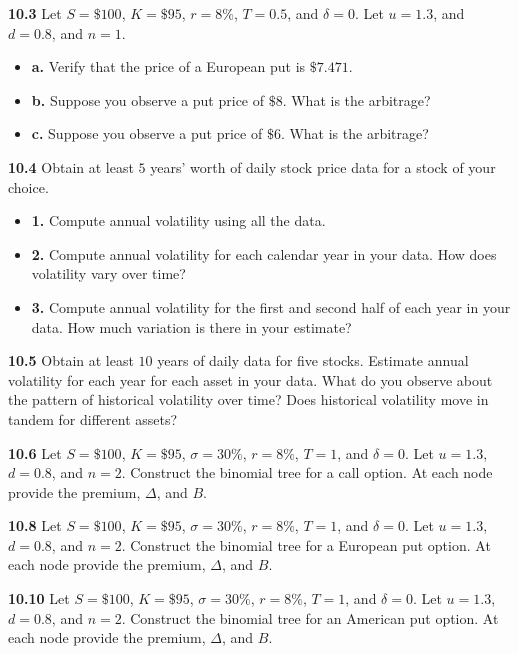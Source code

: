 \documentclass[
  letterpaper,
  DIV=11,
  numbers=noendperiod]{scrartcl}
\begin{document}
\textbf{10.3} Let \(S = \$100\), \(K = \$95\), \(r = 8\%\), \(T = 0.5\),
and \(\delta = 0\). Let \(u = 1.3\), and \(d = 0.8\), and \(n = 1\).

\begin{itemize}
\item
  \textbf{a.} Verify that the price of a European put is \(\$7.471\).
\item
  \textbf{b.} Suppose you observe a put price of \(\$8\). What is the
  arbitrage?
\item
  \textbf{c.} Suppose you observe a put price of \(\$6\). What is the
  arbitrage?
\end{itemize}

\textbf{10.4} Obtain at least \(5\) years' worth of daily stock price
data for a stock of your choice.

\begin{itemize}
\item
  \textbf{1.} Compute annual volatility using all the data.
\item
  \textbf{2.} Compute annual volatility for each calendar year in your
  data. How does volatility vary over time?
\item
  \textbf{3.} Compute annual volatility for the first and second half of
  each year in your data. How much variation is there in your estimate?
\end{itemize}

\textbf{10.5} Obtain at least \(10\) years of daily data for five
stocks. Estimate annual volatility for each year for each asset in your
data. What do you observe about the pattern of historical volatility
over time? Does historical volatility move in tandem for different
assets?

\textbf{10.6} Let \(S = \$100\), \(K = \$95\), \(\sigma = 30\%\),
\(r = 8\%\), \(T = 1\), and \(\delta = 0\). Let \(u = 1.3\),
\(d = 0.8\), and \(n = 2\). Construct the binomial tree for a call
option. At each node provide the premium, \(\Delta\), and \(B\).

\textbf{10.8} Let \(S = \$100\), \(K = \$95\), \(\sigma = 30\%\),
\(r = 8\%\), \(T = 1\), and \(\delta = 0\). Let \(u = 1.3\),
\(d = 0.8\), and \(n = 2\). Construct the binomial tree for a European
put option. At each node provide the premium, \(\Delta\), and \(B\).

\textbf{10.10} Let \(S = \$100\), \(K = \$95\), \(\sigma = 30\%\),
\(r = 8\%\), \(T = 1\), and \(\delta = 0\). Let \(u = 1.3\),
\(d = 0.8\), and \(n = 2\). Construct the binomial tree for an American
put option. At each node provide the premium, \(\Delta\), and \(B\).
\end{document}

